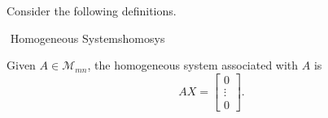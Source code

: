     \pagebreak
    \vphantom
    \\
    \\
    Consider the following definitions.
    \begin{definition}{\Stop\,\,Homogeneous Systems}{homosys}
    
        Given \(A\in\mathcal{M}_{mn}\), the homogeneous system associated with \(A\) is
        \begin{equation*}
            AX=\begin{bmatrix}
            0 \\
            \vdots \\
            0
            \end{bmatrix}.
        \end{equation*}
    
    \end{definition}
